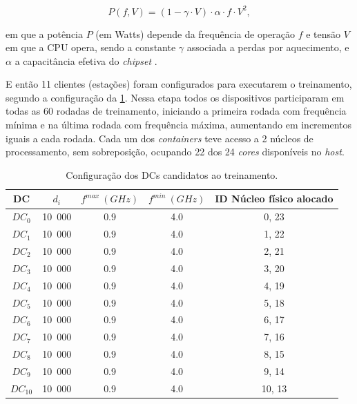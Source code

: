 \begin{equation}
    P(f,V)=(1-\gamma \cdot V) \cdot \alpha\cdot f\cdot V^2, 
    \label{eq:modelo_potencia}
\end{equation}

\noindent em que a potência $P$ (em Watts) depende da frequência de operação $f$ e tensão $V$ em que a CPU opera, sendo a constante $\gamma$ associada a perdas por aquecimento, e $\alpha$ a capacitância efetiva do \textit{chipset} \cite{vogeleer:cpu_power}.

E então 11 clientes (estações) foram configurados para executarem o treinamento, segundo a configuração da \cref{tab:sta_fit_alpha}. Nessa etapa todos os dispositivos participaram em todas as 60 rodadas de treinamento, iniciando a primeira rodada com frequência mínima e na última rodada com frequência máxima, aumentando em incrementos iguais a cada rodada. Cada um dos \textit{containers} teve acesso a 2 núcleos de processamento, sem sobreposição, ocupando 22 dos 24 \textit{cores} disponíveis no \textit{host}.

\begin{table}[H]
        \centering
        \begin{tabular}{c|c|c|c|c}
        DC         & $d_i$ & $f^{max}\ (GHz)$ & $f^{min}\ (GHz)$ & ID Núcleo físico alocado \\
        \hline    
        $ DC_0$  &                         10\ 000  &         0.9      &  4.0    & 0, 23 \\
        $ DC_1$  &                         10\ 000  &         0.9      &  4.0    & 1, 22 \\
        $ DC_2$  &                         10\ 000  &         0.9      &  4.0   & 2, 21 \\
        $ DC_3 $ &                         10\ 000  &         0.9      &  4.0   & 3, 20 \\
        $ DC_4  $&                         10\ 000  &         0.9      &  4.0   & 4, 19 \\
        $ DC_5 $ &                         10\ 000  &         0.9      &  4.0    & 5, 18 \\
        $ DC_6 $ &                         10\ 000  &         0.9      &  4.0    & 6, 17 \\
        $ DC_7 $  &                         10\ 000  &         0.9      &  4.0    & 7, 16 \\
        $ DC_8  $&                         10\ 000  &         0.9      &  4.0    & 8, 15 \\
        $ DC_9 $  &                         10\ 000  &         0.9      &  4.0    & 9, 14 \\
        $ DC_10$  &                         10\ 000  &         0.9      &  4.0    & 10, 13 \\
        \hline
        \end{tabular}
        \caption{Configuração dos DCs candidatos ao treinamento.}
        \label{tab:sta_fit_alpha}
    \end{table}

